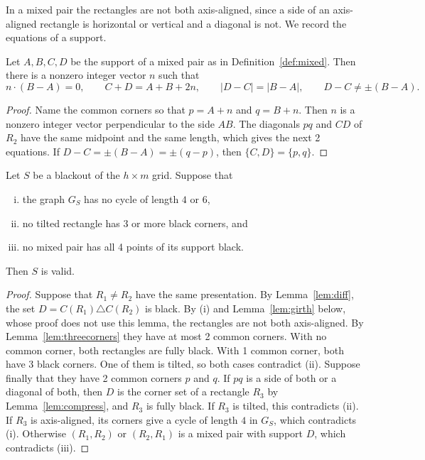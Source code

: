 In a mixed pair the rectangles are not both axis-aligned, since a side of an axis-aligned
rectangle is horizontal or vertical and a diagonal is not. We record the equations of a
support.

\begin{lemma}\label{lem:mixedeq}
Let $A,B,C,D$ be the support of a mixed pair as in Definition~\ref{def:mixed}. Then there is
a nonzero integer vector $n$ such that
\[
 n\cdot(B-A)=0,\qquad C+D=A+B+2n,\qquad |D-C|=|B-A|,\qquad D-C\ne\pm(B-A).
\]
\end{lemma}

\begin{proof}
Name the common corners so that $p=A+n$ and $q=B+n$. Then $n$ is a nonzero integer vector
perpendicular to the side $AB$. The diagonals $pq$ and $CD$ of $R_2$ have the same midpoint
and the same length, which gives the next 2 equations. If $D-C=\pm(B-A)=\pm(q-p)$, then
$\{C,D\}=\{p,q\}$.
\end{proof}

\begin{lemma}[criterion]\label{lem:criterion}
Let $S$ be a blackout of the $h\times m$ grid. Suppose that
\begin{enumerate}[(i)]
\item the graph $G_S$ has no cycle of length $4$ or $6$,
\item no tilted rectangle has 3 or more black corners, and
\item no mixed pair has all 4 points of its support black.
\end{enumerate}
Then $S$ is valid.
\end{lemma}

\begin{proof}
Suppose that $R_1\ne R_2$ have the same presentation. By Lemma~\ref{lem:diff}, the set
$D=C(R_1)\triangle C(R_2)$ is black. By (i) and Lemma~\ref{lem:girth} below, whose proof
does not use this lemma, the rectangles are not both axis-aligned. By
Lemma~\ref{lem:threecorners} they have at most 2 common corners. With no common corner,
both rectangles are fully black. With 1 common corner, both have 3 black corners. One of
them is tilted, so both cases contradict (ii). Suppose finally that they have 2 common
corners $p$ and $q$. If $pq$ is a side of both or a diagonal of both, then $D$ is the
corner set of a rectangle $R_3$ by Lemma~\ref{lem:compress}, and $R_3$ is fully black. If
$R_3$ is tilted, this contradicts (ii). If $R_3$ is axis-aligned, its corners give a cycle
of length $4$ in $G_S$, which contradicts (i). Otherwise $(R_1,R_2)$ or $(R_2,R_1)$ is a
mixed pair with support $D$, which contradicts (iii).
\end{proof}
